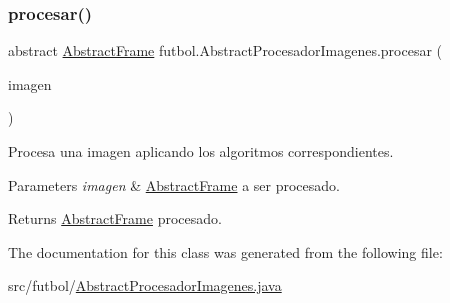 \subsubsection{\texorpdfstring{procesar()}{procesar()}}
{\footnotesize\ttfamily abstract \hyperlink{classfutbol_1_1_abstract_frame}{Abstract\+Frame} futbol.\+Abstract\+Procesador\+Imagenes.\+procesar (\begin{DoxyParamCaption}\item[{\hyperlink{classfutbol_1_1_abstract_frame}{Abstract\+Frame}}]{imagen }\end{DoxyParamCaption})\hspace{0.3cm}{\ttfamily [abstract]}}

Procesa una imagen aplicando los algoritmos correspondientes. 
\begin{DoxyParams}{Parameters}
{\em imagen} & \hyperlink{classfutbol_1_1_abstract_frame}{Abstract\+Frame} a ser procesado. \\
\hline
\end{DoxyParams}
\begin{DoxyReturn}{Returns}
\hyperlink{classfutbol_1_1_abstract_frame}{Abstract\+Frame} procesado. 
\end{DoxyReturn}


The documentation for this class was generated from the following file\+:\begin{DoxyCompactItemize}
\item 
src/futbol/\hyperlink{_abstract_procesador_imagenes_8java}{Abstract\+Procesador\+Imagenes.\+java}\end{DoxyCompactItemize}
